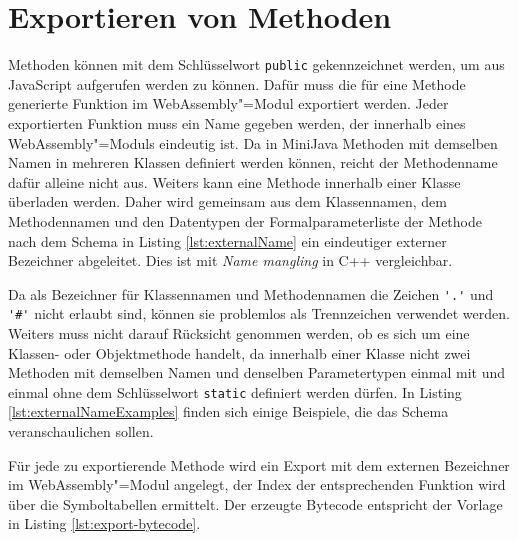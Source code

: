 \section{Exportieren von Methoden}
\label{sec:Exportieren-von-Methoden}

Methoden können mit dem Schlüsselwort \lstinline{public} gekennzeichnet werden, um aus JavaScript aufgerufen werden zu können. Dafür muss die für eine Methode generierte Funktion im WebAssembly"=Modul exportiert werden. Jeder exportierten Funktion muss ein Name gegeben werden, der innerhalb eines WebAssembly"=Moduls eindeutig ist. Da in MiniJava Methoden mit demselben Namen in mehreren Klassen definiert werden können, reicht der Methodenname dafür alleine nicht aus. Weiters kann eine Methode innerhalb einer Klasse überladen werden. Daher wird gemeinsam aus dem Klassennamen, dem Methodennamen und den Datentypen der Formalparameterliste der Methode nach dem Schema in Listing \ref{lst:externalName} ein eindeutiger externer Bezeichner abgeleitet. Dies ist mit \emph{Name mangling} in C++ vergleichbar.



Da als Bezeichner für Klassennamen und Methodennamen die Zeichen \lstinline{'.'} und \lstinline{'#'} nicht erlaubt sind, können sie problemlos als Trennzeichen verwendet werden. Weiters muss nicht darauf Rücksicht genommen werden, ob es sich um eine Klassen- oder Objektmethode handelt, da innerhalb einer Klasse nicht zwei Methoden mit demselben Namen und denselben Parametertypen einmal mit und einmal ohne dem Schlüsselwort \lstinline{static} definiert werden dürfen. In Listing \ref{lst:externalNameExamples} finden sich einige Beispiele, die das Schema veranschaulichen sollen.



Für jede zu exportierende Methode wird ein Export mit dem externen Bezeichner im WebAssembly"=Modul angelegt, der Index der entsprechenden Funktion wird über die Symboltabellen ermittelt. Der erzeugte Bytecode entspricht der Vorlage in Listing \ref{lst:export-bytecode}.



